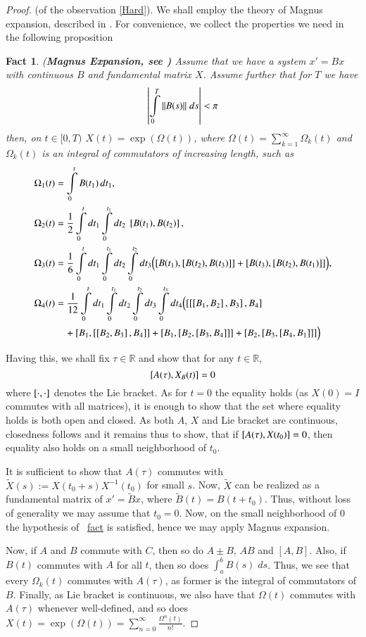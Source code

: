 \documentclass{elsarticle}
\newtheorem*{fact}{Fact}
\theoremstyle{remark}
\begin{document}
\begin{proof}{(of the observation \ref{Hard}).\;}
We shall employ the theory of Magnus expansion, described in \cite{Moan:2008:CMS:1391929.1391932}. For convenience, we collect
the properties we need in the following proposition
\begin{fact}{(\textbf{Magnus Expansion, see \cite{Moan:2008:CMS:1391929.1391932})}}
	Assume that we have a system $x'=Bx$ with continuous $B$ and fundamental matrix $X$. Assume
	further that for $T$ we have
	\[\myabs{\int_0^T\mynorm{B(s)}\;ds}<\pi\]
	then, on $t\in[0,T)$ $X(t)=\exp(\Omega(t))$, where $\Omega(t)=\sum\limits_{k=1}^\infty\Omega_k(t)$ and $\Omega_k(t)$ is an integral
	of commutators of increasing length, such as
	\begin{align*}
	\Omega_1(t) &= \int_0^t B(t_1)\,dt_1, \\
	\Omega_2(t) &= \frac{1}{2}\int_0^t dt_1 \int_0^{t_1} dt_2\ \left[  B(t_1),B(t_2)\right], \\
	\Omega_3(t) &= \frac{1}{6} \int_0^t dt_1 \int_0^{t_1}d t_2 \int_0^{t_2} dt_3
	\Bigl(\left[B(t_1),\left[B(t_2),B(t_3)\right]\right]+\left[B(t_3),\left[  B(t_2),B(t_{1})\right]\right]\Bigr), \\
	\Omega_4(t) &= \frac{1}{12} \int_0^t dt_1 \int_0^{t_1}d t_2 \int_0^{t_2} dt_3 \int_0^{t_3} dt_4
	\Bigl(\left[\left[\left[B_1,B_2\right],B_3\right],B_4\right] \\
	&\quad+\left[B_1,\left[\left[B_2,B_3\right],B_4\right]\right]
	+\left[B_1,\left[B_2,\left[B_3,B_4\right]\right]\right]
	+\left[B_2,\left[B_3,\left[B_4,B_1\right]\right]\right]\Bigr)
	\end{align*}
\end{fact}
Having this, we shall fix $\tau\in\mathbb{R}$ and show that for any $t\in\mathbb{R}$,
\[\left[A(\tau),X_B(t)\right]=0\]
where $\left[\cdot,\cdot\right]$ denotes the Lie bracket. As for $t=0$ the equality holds (as $X(0)=I$ commutes with all matrices), it is enough
to show that the set where equality holds is both open and closed. As both $A$, $X$ and Lie bracket are continuous, closedness follows and it
remains thus to show, that if $\left[A(\tau),X(t_0)\right]=0$, then equality also holds on a small neighborhood of $t_0$.

It is sufficient to show that $A(\tau)$ commutes with $\tilde{X}(s):=X(t_0+s)X^{-1}(t_0)$ for small $s$. Now, $\tilde{X}$ can be realized
as a fundamental matrix of $x'=\tilde{B}x$, where $\tilde{B}(t)=B(t+t_0)$. Thus, without loss of generality we may assume that
$t_0=0$. Now, on the small
neighborhood of $0$ the hypothesis of ~\hyperref[MagnusConvergenceFact]{fact} is satisfied, hence we may apply Magnus expansion.

Now, if $A$ and $B$ commute with $C$, then so do $A\pm B$, $AB$ and $[A,B]$. Also, if $B(t)$ commutes with $A$ for all $t$, then so does
$\int_a^bB(s)\;ds$. Thus, we see that every $\Omega_k(t)$ commutes with $A(\tau)$, as former is the integral of commutators of $B$. Finally,
as Lie bracket is continuous, we also have that $\Omega(t)$ commutes with $A(\tau)$ whenever well-defined, and so does $X(t)=\exp(\Omega(t))=
\sum_{n=0}^\infty\frac{\Omega^n(t)}{n!}$.
\end{proof}
\end{document}
